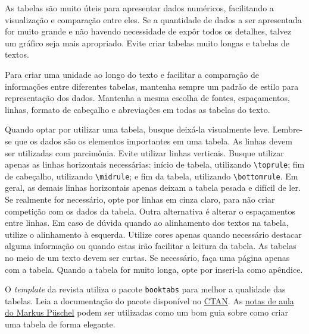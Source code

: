 \documentclass[portuguese]{textolivre}
\begin{document}
As tabelas são muito úteis para apresentar dados numéricos, facilitando a visualização e comparação entre eles.
Se a quantidade de dados a ser apresentada for muito grande e não havendo necessidade de expôr todos os detalhes,
talvez um gráfico seja mais apropriado. Evite criar tabelas muito longas e tabelas de textos.

Para criar uma unidade ao longo do texto e facilitar a comparação de informações entre diferentes tabelas,
mantenha sempre um padrão de estilo para representação dos dados. Mantenha a mesma escolha de fontes,
espaçamentos, linhas, formato de cabeçalho e abreviações em todas as tabelas do texto. 

Quando optar por utilizar uma tabela, busque deixá-la visualmente leve. Lembre-se que os dados são os elementos
importantes em uma tabela. As linhas devem ser utilizadas com parcimônia. 
Evite utilizar linhas verticais. Busque utilizar apenas as linhas horizontais 
necessárias: início de tabela, utilizando \verb|\toprule|; fim de cabeçalho, utilizando \verb|\midrule|; e
fim da tabela, utilizando \verb|\bottomrule|. Em geral, as demais linhas horizontais apenas deixam a tabela
pesada e difícil de ler. Se realmente for necessário, opte por linhas em cinza claro, para não criar competição 
com os dados da tabela. Outra alternativa é alterar o espaçamentos entre linhas. Em caso de dúvida quando ao alinhamento 
dos textos na tabela, utilize o alinhamento à esquerda. Utilize cores apenas quando necessário destacar
alguma informação ou quando estas irão facilitar a leitura da tabela. As tabelas no meio de um texto devem ser curtas.
Se necessário, faça uma página apenas com a tabela. Quando a tabela for muito longa, opte por inseri-la como apêndice.

O \emph{template} da revista utiliza o pacote \verb|booktabs| para melhor a qualidade das tabelas. 
Leia a documentação do pacote disponível no \href{https://www.ctan.org/pkg/booktabs}{CTAN}. 
As \href{https://people.inf.ethz.ch/markusp/teaching/guides/guide-tables.pdf}{notas de aula do Markus Püschel}
podem ser utilizadas como um bom guia sobre como criar uma tabela de forma elegante.
\end{document}
